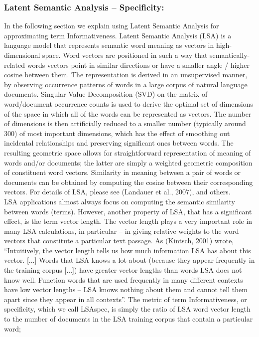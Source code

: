 \subsubsection{Latent Semantic Analysis – Specificity:}
In the following section we explain using Latent Semantic Analysis for approximating term Informativeness. Latent Semantic Analysis (LSA) is a language model that represents semantic word meaning as vectors in high-dimensional space. Word vectors are positioned in such a way that semantically-related words vectors point in similar directions or have a smaller angle / higher cosine between them. The representation is derived in an unsupervised manner, by observing occurrence patterns of words in a large corpus of natural language documents. Singular Value Decomposition (SVD) on the matrix of word/document occurrence counts is used to derive the optimal set of dimensions of the space in which all of the words can be represented as vectors. The number of dimensions is then artificially reduced to a smaller number (typically around 300) of most important dimensions, which has the effect of smoothing out incidental relationships and preserving significant ones between words. The resulting geometric space allows for straightforward representation of meaning of words and/or documents; the latter are simply a weighted geometric composition of constituent word vectors. Similarity in meaning between a pair of words or documents can be obtained by computing the cosine between their corresponding vectors. For details of LSA, please see (Landauer et al., 2007), and others.\\
LSA applications almost always focus on computing the semantic similarity between words (terms). However, another property of LSA, that has a significant effect, is the term vector length. The vector length plays a very important role in many LSA calculations, in particular – in giving relative weights to the word vectors that constitute a particular text passage. As (Kintsch, 2001) wrote, “Intuitively, the vector length tells us how much information LSA has about this vector. [...] Words that LSA knows a lot about (because they appear frequently in the training corpus [...]) have greater vector lengths than words LSA does not know well. Function words that are used frequently in many different contexts have low vector lengths -- LSA knows nothing about them and cannot tell them apart since they appear in all contexts”.
The metric of term Informativeness, or specificity, which we call LSAspec, is simply the ratio of LSA word vector length to the number of documents in the LSA training corpus that contain a particular word;
